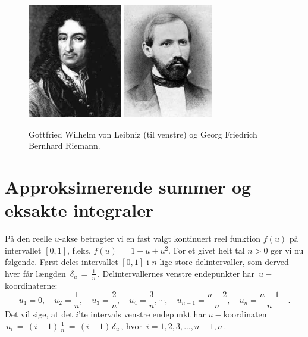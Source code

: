 \begin{figure}[h]
\centerline{\includegraphics[height=50mm]{FIGS/PERSLeibniz} \qquad \includegraphics[height=50mm]{FIGS/PERSRiemann_3}}
\begin{center}
\caption{\small{Gottfried Wilhelm von Leibniz (til venstre) og  Georg Friedrich Bernhard Riemann. }} \label{figLeibniz}
\end{center}
\end{figure}





\section{Approksimerende {summer} og eksakte {integraler}} \label{secSummer}
På den reelle $u$-akse betragter vi en fast valgt kontinuert reel
funktion $f(u)$ på intervallet $[0,1]$, f.eks. $f(u)\,=\, 1+u+u^{2}$. For et givet helt tal $n >0$
gør vi nu følgende. Først deles intervallet $[0, 1]$ i $n$ lige
store delintervaller, som derved hver får længden $\,\delta_{u} \, =
\, \frac{1}{n}\, $. Delintervallernes venstre endepunkter har
$\,u-$koordinaterne:
$$
u_{1} = 0, \quad u_{2} = \frac{1}{n},\quad u_{3} = \frac{2}{n},\quad
u_{4} = \frac{3}{n},\cdots , \quad u_{n-1} = \frac{n-2}{n},\quad
u_{n} = \frac{n-1}{n} \quad .
$$
Det vil sige, at det $i$'te intervals venstre endepunkt har
$u-$koordinaten $\,u_{i}\, = \, (i-1)\,\frac{1}{n}\, = \,
(i-1)\,\delta_{u}\,$, hvor $\, i = 1, 2, 3, ..., n-1, n \,$.


